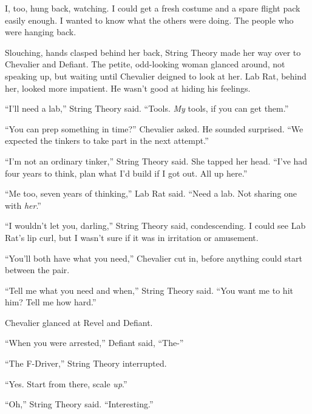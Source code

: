 I, too, hung back, watching.  I could get a fresh costume and a spare flight pack easily enough.  I wanted to know what the others were doing.  The people who were hanging back.



Slouching, hands clasped behind her back, String Theory made her way over to Chevalier and Defiant.  The petite, odd-looking woman glanced around, not speaking up, but waiting until Chevalier deigned to look at her.  Lab Rat, behind her, looked more impatient.  He wasn't good at hiding his feelings.



``I'll need a lab,'' String Theory said.  ``Tools.  \emph{My} tools, if you can get them.''



``You can prep something in time?''  Chevalier asked.  He sounded surprised.  ``We expected the tinkers to take part in the next attempt.''



``I'm not an ordinary tinker,'' String Theory said.  She tapped her head.  ``I've had four years to think, plan what I'd build if I got out.  All up here.''



``Me too, seven years of thinking,'' Lab Rat said.  ``Need a lab.  Not sharing one with \emph{her}.''



``I wouldn't let you, darling,'' String Theory said, condescending.  I could see Lab Rat's lip curl, but I wasn't sure if it was in irritation or amusement.



``You'll both have what you need,'' Chevalier cut in, before anything could start between the pair.



``Tell me what you need and when,'' String Theory said.  ``You want me to hit him?  Tell me how hard.''



Chevalier glanced at Revel and Defiant.



``When you were arrested,'' Defiant said, ``The-''



``The F-Driver,'' String Theory interrupted.



``Yes.  Start from there, scale \emph{up}.''



``Oh,'' String Theory said.  ``Interesting.''



